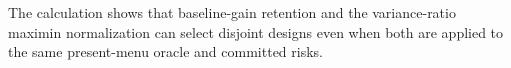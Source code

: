 The calculation shows that baseline-gain retention and the variance-ratio maximin normalization can select disjoint designs even when both are applied to the same present-menu oracle and committed risks.